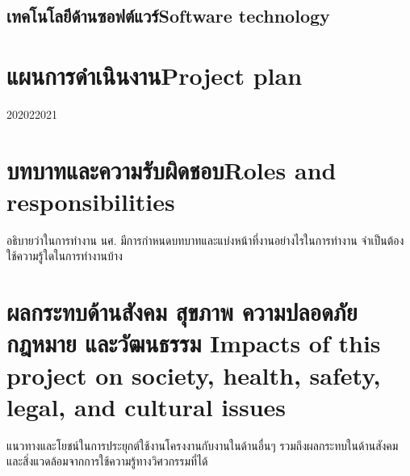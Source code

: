 \subsection{\ifcpe เทคโนโลยีด้านซอฟต์แวร์\else Software technology\fi}

\section{\ifcpe แผนการดำเนินงาน\else Project plan\fi}

\begin{plan}{6}{2020}{2}{2021}
\end{plan}

\section{\ifcpe บทบาทและความรับผิดชอบ\else Roles and responsibilities\fi}
อธิบายว่าในการทำงาน นศ. มีการกำหนดบทบาทและแบ่งหน้าที่งานอย่างไรในการทำงาน จำเป็นต้องใช้ความรู้ใดในการทำงานบ้าง

\section{\ifcpe%
ผลกระทบด้านสังคม สุขภาพ ความปลอดภัย กฎหมาย และวัฒนธรรม
\else%
Impacts of this project on society, health, safety, legal, and cultural issues
\fi}

แนวทางและโยชน์ในการประยุกต์ใช้งานโครงงานกับงานในด้านอื่นๆ รวมถึงผลกระทบในด้านสังคมและสิ่งแวดล้อมจากการใช้ความรู้ทางวิศวกรรมที่ได้
